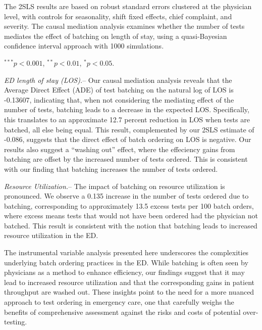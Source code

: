 \documentclass[,,nonblindrev]{informs}
\begin{document}
\begin{table}[!htbp]
\begin{threeparttable}
\begin{tablenotes}
\small
\item The 2SLS results are based on robust standard errors clustered at the physician level, with controls for seasonality, shift fixed effects, chief complaint, and severity. The causal mediation analysis examines whether the number of tests mediates the effect of batching on length of stay, using a quasi-Bayesian confidence interval approach with 1000 simulations.
\item $^{***} p < 0.001$, $^{**} p < 0.01$, $^{*} p < 0.05$.
\end{tablenotes}
\end{threeparttable}
\end{table}

\emph{ED length of stay (LOS).}-- Our causal mediation analysis reveals
that the Average Direct Effect (ADE) of test batching on the natural log
of LOS is -0.13607, indicating that, when not considering the mediating
effect of the number of tests, batching leads to a decrease in the
expected LOS. Specifically, this translates to an approximate 12.7
percent reduction in LOS when tests are batched, all else being equal.
This result, complemented by our 2SLS estimate of -0.086, suggests that
the direct effect of batch ordering on LOS is negative. Our results also
suggest a ``washing out'' effect, where the effeciency gains from
batching are offset by the increased number of tests ordered. This is
consistent with our finding that batching increases the number of tests
ordered.

\emph{Resource Utilization.}-- The impact of batching on resource
utilization is pronounced. We observe a 0.135 increase in the number of
tests ordered due to batching, corresponding to approximately 13.5
excess tests per 100 batch orders, where excess means tests that would
not have been ordered had the physician not batched. This result is
consistent with the notion that batching leads to increased resource
utilization in the ED.

The instrumental variable analysis presented here underscores the
complexities underlying batch ordering practices in the ED. While
batching is often seen by physicians as a method to enhance efficiency,
our findings suggest that it may lead to increased resource utilization
and that the corresponding gains in patient throughput are washed out.
These insights point to the need for a more nuanced approach to test
ordering in emergency care, one that carefully weighs the benefits of
comprehensive assessment against the risks and costs of potential
over-testing.
\end{document}
